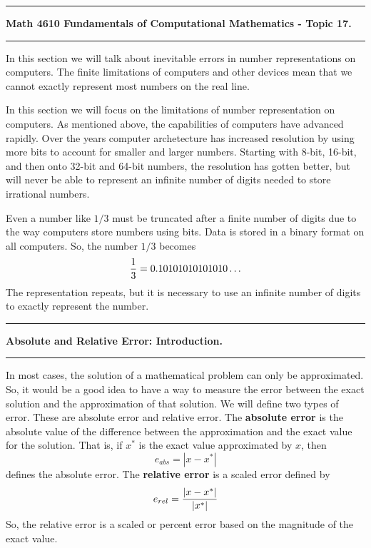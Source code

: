 \documentclass[10pt,fleqn]{article}
\begin{document}
\vskip0.1in\hrule\vskip0.1in \noindent
{\bf Math 4610 Fundamentals of Computational Mathematics  - Topic 17.}
\vskip0.1in\hrule\vskip0.1in \noindent
In this section we will talk about inevitable errors in number representations
on computers. The finite limitations of computers and other devices mean that we
cannot exactly represent most numbers on the real line. 

In this section we will focus on the limitations of number representation on
computers. As mentioned above, the capabilities of computers have advanced
rapidly. Over the years computer
archetecture has increased resolution by using more bits to account for smaller
and larger numbers. Starting with 8-bit, 16-bit, and then onto 32-bit and 64-bit
numbers, the resolution has gotten better, but will never be able to represent
an infinite number of digits needed to store irrational numbers.

Even a number like \(1/3\) must be truncated after a finite number of digits due
to the way computers store numbers using bits. Data is stored in a binary format
on all computers. So, the number \(1/3\) becomes
\[
  {1\over 3} = 0.10101010101010\ldots
\]
The representation repeats, but it is necessary to use an infinite number of
digits to exactly represent the number.


\vskip0.1in\hrule\vskip0.1in
\noindent
{\bf Absolute and Relative Error: Introduction.} 
\vskip0.1in\hrule\vskip0.1in
\noindent
In most cases, the solution of a mathematical problem can only be approximated.
So, it would be a good idea to have a way to measure the error between the exact
solution and the approximation of that solution. We will define two types of
error. These are absolute error and relative error. The {\bf absolute error} is
the absolute value of the difference between the approximation and the exact
value for the solution. That is, if $x^*$ is the exact value approximated by
$x$, then
$$ e_{abs} = | x - x^{*} | $$
defines the absolute error. The {\bf relative error} is a scaled error defined
by
$$ e_{rel} = {{| x - x^{*} |}\over{|x^*|}} $$
So, the relative error is a scaled or percent error based on the magnitude of
the exact value.
\end{document}
